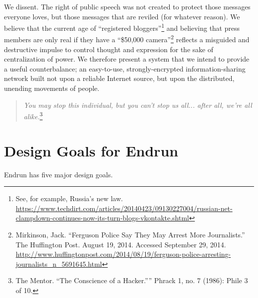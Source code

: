 \documentclass[12pt]{article}
\begin{document}
  We dissent. The right of public speech was not created to protect those messages everyone loves, but those messages that are reviled (for whatever reason). We believe that the current age of ``registered bloggers''\footnote{See, for example, Russia's new law. \url{https://www.techdirt.com/articles/20140423/09130227004/russian-net-clampdown-continues-now-its-turn-blogs-vkontakte.shtml}} and believing that press members are only real if they have a ``\$50,000 camera''\footnote{Mirkinson, Jack. ``Ferguson Police Say They May Arrest More Journalists.'' The Huffington Post. August 19, 2014. Accessed September 29, 2014. \url{http://www.huffingtonpost.com/2014/08/19/ferguson-police-arresting-journalists_n_5691645.html}} reflects a misguided and destructive impulse to control thought and expression for the sake of centralization of power. We therefore present a system that we intend to provide a useful counterbalance; an easy-to-use, strongly-encrypted information-sharing network built not upon a reliable Internet source, but upon the distributed, unending movements of people. 
  
  \begin{quote}
    \emph{You may stop this individual, but you can't stop us all... after all, we're all alike.}\footnote{The Mentor. ``The Conscience of a Hacker.'''' Phrack 1, no. 7 (1986): Phile 3 of 10.}
  \end{quote}
  
  \section{Design Goals for Endrun}
  
  Endrun has five major design goals.
  
\end{document}
